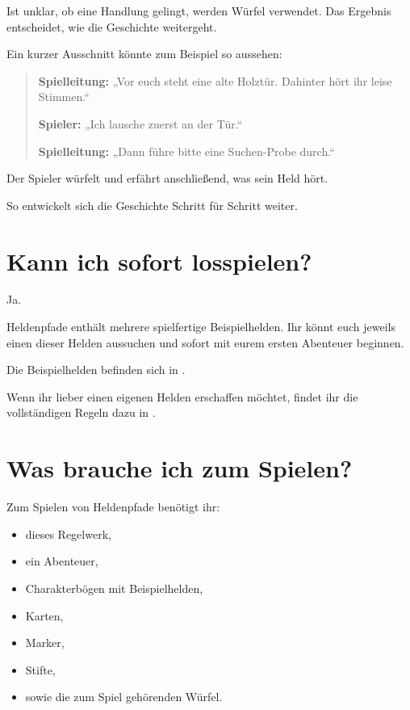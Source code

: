 Ist unklar, ob eine Handlung gelingt, werden Würfel verwendet. Das Ergebnis entscheidet, wie die Geschichte weitergeht.

Ein kurzer Ausschnitt könnte zum Beispiel so aussehen:

\begin{quote}
\textbf{Spielleitung:} „Vor euch steht eine alte Holztür. Dahinter hört ihr leise Stimmen.“

\textbf{Spieler:} „Ich lausche zuerst an der Tür.“

\textbf{Spielleitung:} „Dann führe bitte eine Suchen-Probe durch.“
\end{quote}

Der Spieler würfelt und erfährt anschließend, was sein Held hört.

So entwickelt sich die Geschichte Schritt für Schritt weiter.

\section{Kann ich sofort losspielen?}

Ja.

Heldenpfade enthält mehrere spielfertige Beispielhelden. Ihr könnt euch jeweils einen dieser Helden aussuchen und sofort mit eurem ersten Abenteuer beginnen.

Die Beispielhelden befinden sich in .

Wenn ihr lieber einen eigenen Helden erschaffen möchtet, findet ihr die vollständigen Regeln dazu in .

\section{Was brauche ich zum Spielen?}

Zum Spielen von Heldenpfade benötigt ihr:

\begin{itemize}
  \item dieses Regelwerk,
  \item ein Abenteuer,
  \item Charakterbögen mit Beispielhelden,
  \item Karten,
  \item Marker,
  \item Stifte,
  \item sowie die zum Spiel gehörenden Würfel.
\end{itemize}

